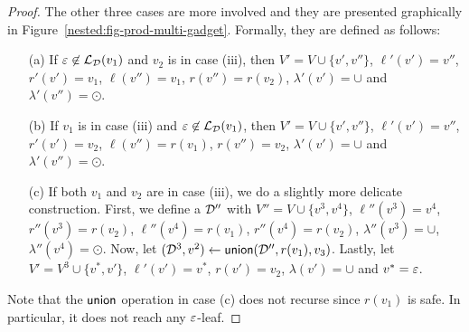 \begin{proof}


The other three cases are more involved and they are presented graphically in Figure~\ref{nested:fig-prod-multi-gadget}. 
Formally, they are defined as follows:
\begin{itemize}
	\item[(a)] If $\varepsilon\not\in\mathcal{L}_{\mathcal{D}}(v_1)$ and $v_2$ is in case (iii), then $V' = V\cup\{v',v''\}$, $\ell'(v') = v''$, $r'(v') = v_1$, $\ell(v'') = v_1$,  $r(v'') = r(v_2)$, $\lambda'(v') = \cup$ and $\lambda'(v'') = \odot$. 
	\item[(b)] If $v_1$ is in case (iii) and $\varepsilon\not\in\mathcal{L}_{\mathcal{D}}(v_1)$, then $V' = V\cup\{v',v''\}$,  $\ell'(v') = v''$, $r'(v') = v_2$, $\ell(v'') = r(v_1)$,  $r(v'') = v_2$, $\lambda'(v') = \cup$ and $\lambda'(v'') = \odot$. 
	\item[(c)] If both $v_1$ and $v_2$ are in case (iii), we do a slightly more delicate construction. 
	First, we define a $\mathcal{D}''$ with $V'' = V\cup\{v^{3},v^{4}\}$, $\ell''(v^3) = v^4$, $r''(v^3) = r(v_2)$, $\ell''(v^4) = r(v_1)$, $r''(v^4) = r(v_2)$, $\lambda''(v^3) = \cup$, $\lambda''(v^4) = \odot$.
	Now, let $(\mathcal{D}^3, v^2) \gets \mathsf{union}(\mathcal{D}'', r(v_1), v_3)$.
	Lastly, let $V' = V^3 \cup \{v^{*}, v'\}$, $\ell'(v') = v^*$, $r(v') = v_2$, $\lambda(v') = \cup$ and $v^* = \varepsilon$.
\end{itemize}
Note that the $\mathsf{union}$ operation in case (c) does not recurse since $r(v_1)$ is safe. In particular, it does not reach any $\varepsilon$-leaf.


\end{proof}
